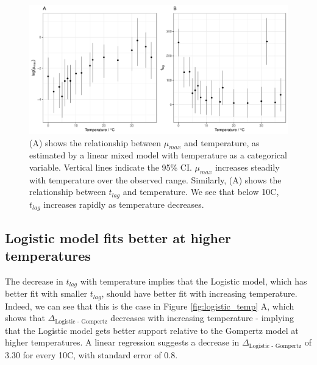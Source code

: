 \documentclass[11pt, a4paper]{article}
\begin{document}
\begin{linenumbers}
                \begin{figure}[H]
        \includegraphics[width=\linewidth]{../results/tlags.pdf}
        \caption{(A) shows the relationship between $\mu_{max}$ and temperature, as estimated by a linear mixed model with temperature as a categorical variable. Vertical lines indicate the 95\% CI. $\mu_{max}$ increases steadily with temperature over the observed range. Similarly, (A) shows the relationship between $t_{lag}$ and temperature. We see that below 10\degree C, $t_{lag}$ increases rapidly as temperature decreases.   }
        \label{fig:params_temp}
        \end{figure}  



\subsection{Logistic model fits better at higher temperatures}

The decrease in $t_{lag}$ with temperature implies that the Logistic model, which has better fit with smaller $t_{lag}$, should have better fit with increasing temperature. Indeed, we can see that this is the case in Figure \ref{fig:logistic_temp} A, which shows that $\Delta_{\text{Logistic - Gompertz}}$  decreases with increasing temperature - implying that the Logistic model gets better support relative to the Gompertz model at higher temperatures. A linear regression suggests a decrease in $\Delta_{\text{Logistic - Gompertz}}$ of 3.30 for every 10\degree C, with standard error of 0.8.


\end{linenumbers}
\end{document}
